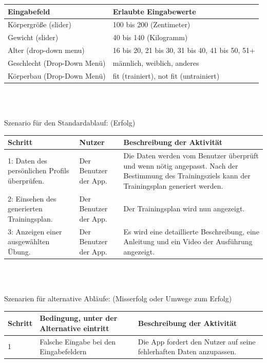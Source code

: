 \documentclass[FIPLY_base.tex]{subfiles}
\begin{document}
	\begin{center}
		\def\arraystretch{1.3}%
		\begin{tabular}{| p{5cm} | p{5cm} |}
			\hline
			\textbf{Eingabefeld} & \textbf{Erlaubte Eingabewerte}
			\\ \hline 
			Körpergröße (slider) & 100 bis 200 (Zentimeter) 
			\\ \hline
			Gewicht (slider) & 40 bis 140 (Kilogramm)
			\\ \hline
			Alter (drop-down menu) & 16 bis 20,
					21 bis 30,
					31 bis 40,
					41 bis 50,
					51+
			\\ \hline
			Geschlecht (Drop-Down Menü) & männlich, weiblich, anderes
			\\ \hline
			Körperbau (Drop-Down Menü) & fit (trainiert), not fit (untrainiert)
			\\ \hline
		\end{tabular} \\
	\end{center}
		\ \\
	Szenario für den Standardablauf: (Erfolg)
	\begin{center}
		\def\arraystretch{1.3}%
		\begin{tabular}{| p{3cm} | p{3cm} | p{6cm} |}
			\hline
			\textbf{Schritt} & \textbf{Nutzer} & 
			\textbf{Beschreibung der Aktivität} 
			\\ \hline 
			1: Daten des persönlichen Profils überprüfen. & Der Benutzer der App. & Die Daten werden vom Benutzer überprüft und wenn nötig angepasst. Nach der Bestimmung des Trainingsziels kann der Trainingsplan generiert werden.
			\\ \hline  
			2: Einsehen des generierten Trainingsplan. & Der Benutzer der App. & Der Trainingsplan wird nun angezeigt. 
			\\ \hline
			3: Anzeigen einer ausgewählten Übung. & Der Benutzer der App. & Es wird eine detaillierte Beschreibung, eine Anleitung und ein Video der Ausführung angezeigt.  \\ \hline
		\end{tabular} \\
	\end{center}
	\ \\
	Szenarien für alternative Abläufe: (Misserfolg oder Umwege zum Erfolg)
		\ \\
	\begin{center}
		\def\arraystretch{1.3}%
		\begin{tabular}{| p{3cm} | p{3cm} | p{6cm} |}
			\hline
			\textbf{Schritt} & \textbf{Bedingung, unter der Alternative eintritt} & \textbf{Beschreibung der Aktivität} 
			\\ \hline 
			1 & Falsche Eingabe bei den Eingabefeldern & Die App fordert den Nutzer auf seine fehlerhaften Daten anzupassen.\\ \hline
		\end{tabular} \\
	\end{center}
\end{document}
